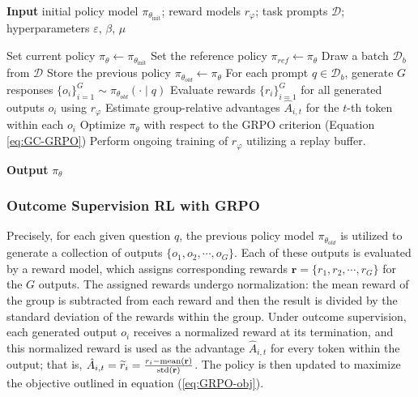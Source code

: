 \begin{itemize}[topsep=0pt]
\begin{itemize}[topsep=0pt]
\begin{algorithm}[t]
  \small
  \caption{Iterative Group Relative Policy Optimization}
  \textbf{Input} initial policy model $\pi_{\theta_{\text{init}}}$; reward models $r_\varphi$; task prompts $\mathcal{D}$;
  hyperparameters $\varepsilon$, $\beta$, $\mu$
  \begin{algorithmic}[1]
    \State Set current policy $\pi_\theta \leftarrow \pi_{\theta_{\text{init}}}$
       \State Set the reference policy $\pi_{ref} \leftarrow \pi_{\theta}$
      \State Draw a batch $\mathcal{D}_b$ from $\mathcal{D}$
      \State Store the previous policy $\pi_{\theta_{old}} \leftarrow \pi_{\theta}$
      \State For each prompt $q \in \mathcal{D}_b$, generate $G$ responses $\{o_i\}_{i=1}^G \sim \pi_{\theta_{old}} (\cdot \mid q) $
      \State Evaluate rewards $\{r_i\}_{i=1}^{G}$ for all generated outputs $o_i$ using $r_{\varphi}$
      \State Estimate group-relative advantages $\hat{A}_{i,t}$ for the $t$-th token within each $o_i$
        \State Optimize $\pi_{\theta}$ with respect to the GRPO criterion (Equation \ref{eq:GC-GRPO})
      \EndFor
    \EndFor \State Perform ongoing training of $r_\varphi$ utilizing a replay buffer.
    \EndFor
  \end{algorithmic}
  \textbf{Output} $\pi_\theta$
  \label{alg:iter-grpo}
\end{algorithm}

\subsubsection{Outcome Supervision RL with GRPO} Precisely, for each given question $q$, the previous policy model $\pi_{\theta_{old}}$ is utilized to generate a collection of outputs $\{o_1, o_2, \cdots, o_G\}$. Each of these outputs is evaluated by a reward model, which assigns corresponding rewards $\mathbf{r}=\{r_1, r_2, \cdots, r_G\}$ for the $G$ outputs. The assigned rewards undergo normalization: the mean reward of the group is subtracted from each reward and then the result is divided by the standard deviation of the rewards within the group. Under outcome supervision, each generated output $o_i$ receives a normalized reward at its termination, and this normalized reward is used as the advantage $\hat{A}_{i, t}$ for every token within the output; that is, $\hat{A}_{i, t} = \widetilde{r}_i = \frac{r_i- {\rm mean}(\mathbf{r})}{{\rm std}(\mathbf{r})}$. The policy is then updated to maximize the objective outlined in equation (\ref{eq:GRPO-obj}).


\end{itemize}
\end{itemize}
